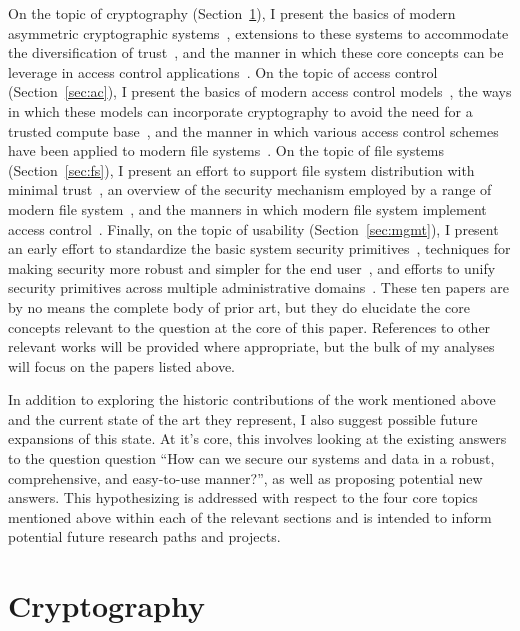 \documentclass{sig-alternate}
\begin{document}
On the topic of cryptography (Section~\ref{sec:crypto}), I present the
basics of modern asymmetric cryptographic systems~\cite{Diffie1976},
extensions to these systems to accommodate the diversification of
trust~\cite{Shamir1979}, and the manner in which these core concepts
can be leverage in access control
applications~\cite{Bethencourt2007}. On the topic of access control
(Section~\ref{sec:ac}), I present the basics of modern access control
models~\cite{Sandhu1996}, the ways in which these models can
incorporate cryptography to avoid the need for a trusted compute
base~\cite{Bethencourt2007}, and the manner in which various access
control schemes have been applied to modern file
systems~\cite{Miltchev2008}. On the topic of file systems
(Section~\ref{sec:fs}), I present an effort to support file system
distribution with minimal trust~\cite{Mazieres1999}, an overview of
the security mechanism employed by a range of modern file
system~\cite{Kher2005}, and the manners in which modern file system
implement access control~\cite{Miltchev2008}. Finally, on the topic of
usability (Section~\ref{sec:mgmt}), I present an early effort to
standardize the basic system security primitives~\cite{Samar1996},
techniques for making security more robust and simpler for the end
user~\cite{Cox2002}, and efforts to unify security primitives across
multiple administrative domains~\cite{Morgan2004}. These ten papers
are by no means the complete body of prior art, but they do elucidate
the core concepts relevant to the question at the core of this
paper. References to other relevant works will be provided where
appropriate, but the bulk of my analyses will focus on the papers
listed above.

In addition to exploring the historic contributions of the work
mentioned above and the current state of the art they represent, I
also suggest possible future expansions of this state. At it's core,
this involves looking at the existing answers to the question question
``How can we secure our systems and data in a robust, comprehensive,
and easy-to-use manner?'', as well as proposing potential new
answers. This hypothesizing is addressed with respect to the four core
topics mentioned above within each of the relevant sections and is
intended to inform potential future research paths and projects.

\section{Cryptography}
\label{sec:crypto}
\end{document}
